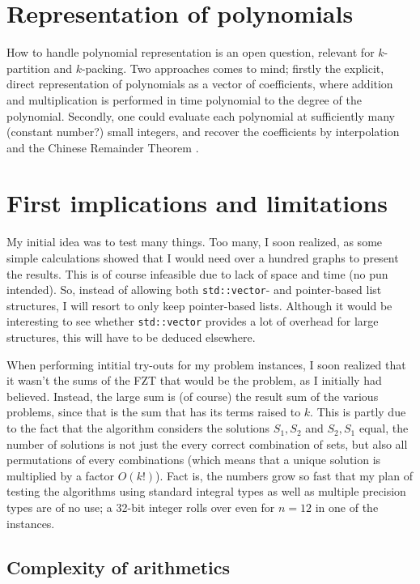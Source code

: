\documentclass[a4paper, titlepage]{article}
\newcommand{\code}{\texttt}
\begin{document}
\section{Representation of polynomials}
How to handle polynomial representation is an open question, relevant for $k$-partition and $k$-packing. Two approaches comes to mind; firstly the explicit, direct representation of polynomials as a vector of coefficients, where addition and multiplication is performed in time polynomial to the degree of the polynomial. Secondly, one could evaluate each polynomial at sufficiently many (constant number?) small integers, and recover the coefficients by interpolation and the Chinese Remainder Theorem \cite{CRT}.

\section{First implications and limitations}
My initial idea was to test many things. Too many, I soon realized, as some simple calculations showed that I would need over a hundred graphs to present the results. This is of course infeasible due to lack of space and time (no pun intended). So, instead of allowing both \code{std::vector}- and pointer-based list structures, I will resort to only keep pointer-based lists. Although it would be interesting to see whether \code{std::vector} provides a lot of overhead for large structures, this will have to be deduced elsewhere.

When performing intitial try-outs for my problem instances, I soon realized that it wasn't the sums of the FZT that would be the problem, as I initially had believed. Instead, the large sum is (of course) the result sum of the various problems, since that is the sum that has its terms raised to $k$. This is partly due to the fact that the algorithm considers the solutions $S_1, S_2$ and $S_2, S_1$ equal, the number of solutions is not just the every correct combination of sets, but also all permutations of every combinations (which means that a unique solution is multiplied by a factor $O(k!)$). Fact is, the numbers grow so fast that my plan of testing the algorithms using standard integral types as well as multiple precision types are of no use; a 32-bit integer rolls over even for $n=12$ in one of the instances. 

\subsection{Complexity of arithmetics}
\end{document}
